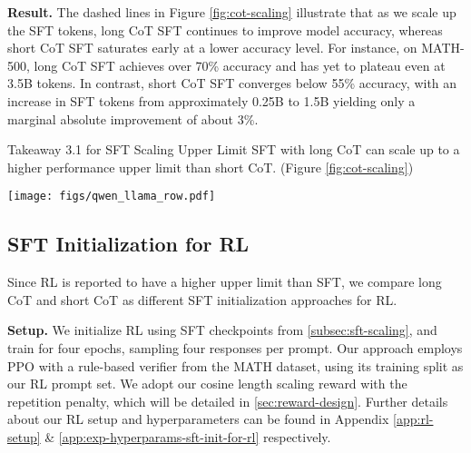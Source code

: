 \noindent\textbf{Result.} The dashed lines in Figure \ref{fig:cot-scaling} illustrate that as we scale up the SFT tokens, long CoT SFT continues to improve model accuracy, whereas short CoT SFT saturates early at a lower accuracy level. For instance, on MATH-500, long CoT SFT achieves over 70\% accuracy and has yet to plateau even at 3.5B tokens. In contrast, short CoT SFT converges below 55\% accuracy, with an increase in SFT tokens from approximately 0.25B to 1.5B yielding only a marginal absolute improvement of about 3\%.

\begin{AIbox}{Takeaway 3.1 for SFT Scaling Upper Limit}
SFT with long CoT can scale up to a higher performance upper limit than short CoT. (Figure \ref{fig:cot-scaling})
\end{AIbox}

\begin{figure*}[!t]
    \centering
    \texttt{[image: figs/qwen\_llama\_row.pdf]}
    \vspace{-20pt}
    \caption{Both \texttt{Llama3.1-8B} and \texttt{Qwen2.5-Math-7B} models trained under RL with the Classic Reward manifested emergent CoT length scaling past the context window size, resulting in a decline in MATH-500 accuracy. The red points on the charts correspond to the iteration where the accuracy dropped to near zero. ``Terminated CoTs'' refer to responses that conclude within the context length.}
        \vspace{-10pt}

    \label{fig:reward-qwen-llama}
\end{figure*}

\subsection{SFT Initialization for RL}\label{sec:sft-init-for-rl}

Since RL is reported to have a higher upper limit than SFT, we compare long CoT and short CoT as different SFT initialization approaches for RL.

\noindent\textbf{Setup.}
We initialize RL using SFT checkpoints from \textsection\ref{subsec:sft-scaling}, and train for four epochs, sampling four responses per prompt. Our approach employs PPO \citep{schulman2017ppo} with a rule-based verifier from the MATH dataset, using its training split as our RL prompt set.
We adopt our cosine length scaling reward with the repetition penalty, which will be detailed in \textsection\ref{sec:reward-design}.
Further details about our RL setup and hyperparameters can be found in Appendix \ref{app:rl-setup} \& \ref{app:exp-hyperparams-sft-init-for-rl} respectively.


